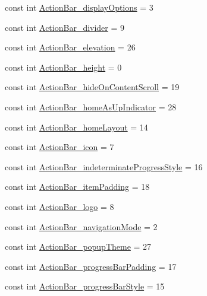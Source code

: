 \begin{CompactItemize}
const int \hyperlink{class__2doo_1_1_droid_1_1_resource_1_1_styleable_c3d7085249c1bea1f8e5b7cfa0d286a0}{ActionBar\_\-displayOptions} = 3
\item 
const int \hyperlink{class__2doo_1_1_droid_1_1_resource_1_1_styleable_85026eec0d477c059dbe790d64e574d2}{ActionBar\_\-divider} = 9
\item 
const int \hyperlink{class__2doo_1_1_droid_1_1_resource_1_1_styleable_0c6ae6c14a7c0f3142c11344114beec0}{ActionBar\_\-elevation} = 26
\item 
const int \hyperlink{class__2doo_1_1_droid_1_1_resource_1_1_styleable_e8aef7273684f182d40a62dc5e974d11}{ActionBar\_\-height} = 0
\item 
const int \hyperlink{class__2doo_1_1_droid_1_1_resource_1_1_styleable_ef553ba76209839ffb5a48bad8b56d21}{ActionBar\_\-hideOnContentScroll} = 19
\item 
const int \hyperlink{class__2doo_1_1_droid_1_1_resource_1_1_styleable_391b189da09f3224acc904190791b8d0}{ActionBar\_\-homeAsUpIndicator} = 28
\item 
const int \hyperlink{class__2doo_1_1_droid_1_1_resource_1_1_styleable_4c70ecfa8eba6482e75ed2171e573d0c}{ActionBar\_\-homeLayout} = 14
\item 
const int \hyperlink{class__2doo_1_1_droid_1_1_resource_1_1_styleable_387c6e7e72e93a418e55a146b1eae706}{ActionBar\_\-icon} = 7
\item 
const int \hyperlink{class__2doo_1_1_droid_1_1_resource_1_1_styleable_6340d74662f8538f8199d1a87528024c}{ActionBar\_\-indeterminateProgressStyle} = 16
\item 
const int \hyperlink{class__2doo_1_1_droid_1_1_resource_1_1_styleable_9a7eb5490e21f09823b4079b59a406bd}{ActionBar\_\-itemPadding} = 18
\item 
const int \hyperlink{class__2doo_1_1_droid_1_1_resource_1_1_styleable_e9537a6daa96b857c7838be4c88b9732}{ActionBar\_\-logo} = 8
\item 
const int \hyperlink{class__2doo_1_1_droid_1_1_resource_1_1_styleable_7c0734574e2de707bfddb8503c8f6aeb}{ActionBar\_\-navigationMode} = 2
\item 
const int \hyperlink{class__2doo_1_1_droid_1_1_resource_1_1_styleable_a928ed9e12b38dc3fb0a70d205e7c079}{ActionBar\_\-popupTheme} = 27
\item 
const int \hyperlink{class__2doo_1_1_droid_1_1_resource_1_1_styleable_69791ae28e12495e9f96d0f76726a2aa}{ActionBar\_\-progressBarPadding} = 17
\item 
const int \hyperlink{class__2doo_1_1_droid_1_1_resource_1_1_styleable_9c28916581b93f936e38d2169a0bf67b}{ActionBar\_\-progressBarStyle} = 15

\end{CompactItemize}
